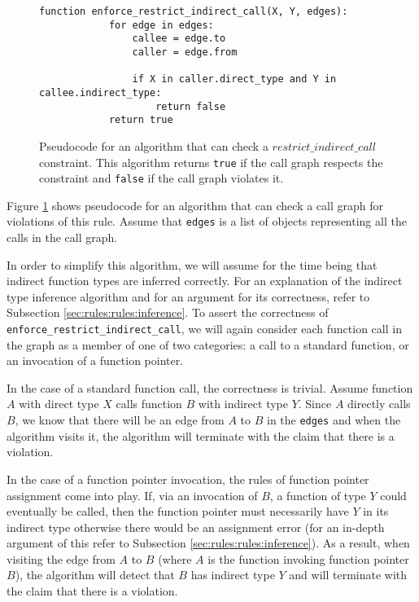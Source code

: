 \begin{figure}
    \begin{lstlisting}[gobble=8]
        function enforce_restrict_indirect_call(X, Y, edges):
            for edge in edges:
                callee = edge.to
                caller = edge.from

                if X in caller.direct_type and Y in callee.indirect_type:
                    return false
            return true
    \end{lstlisting}
    \caption{Pseudocode for an algorithm that can check a $restrict\_indirect\_call$ constraint.  This algorithm returns \lstinline{true} if the call graph respects the constraint and \lstinline{false} if the call graph violates it.}
    \label{lst:rules:rules:restrict_indirect_call}
\end{figure}

Figure \ref{lst:rules:rules:restrict_indirect_call} shows pseudocode for an algorithm that can check a call graph for violations of this rule.  Assume that \lstinline{edges} is a list of objects representing all the calls in the call graph.  

In order to simplify this algorithm, we will assume for the time being that indirect function types are inferred correctly.  For an explanation of the indirect type inference algorithm and for an argument for its correctness, refer to Subsection \ref{sec:rules:rules:inference}.  To assert the correctness of \lstinline{enforce_restrict_indirect_call}, we will again consider each function call in the graph as a member of one of two categories: a call to a standard function, or an invocation of a function pointer.

In the case of a standard function call, the correctness is trivial.  Assume function $A$ with direct type $X$ calls function $B$ with indirect type $Y$.  Since $A$ directly calls $B$, we know that there will be an edge from $A$ to $B$ in the \lstinline{edges} and when the algorithm visits it, the algorithm will terminate with the claim that there is a violation.

In the case of a function pointer invocation, the rules of function pointer assignment come into play.  If, via an invocation of $B$, a function of type $Y$ could eventually be called, then the function pointer must necessarily have $Y$ in its indirect type otherwise there would be an assignment error (for an in-depth argument of this refer to Subsection \ref{sec:rules:rules:inference}).  As a result, when visiting the edge from $A$ to $B$ (where $A$ is the function invoking function pointer $B$), the algorithm will detect that $B$ has indirect type $Y$ and will terminate with the claim that there is a violation.  

